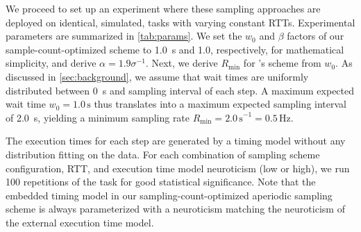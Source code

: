 We proceed to set up an experiment where these sampling approaches are deployed on identical, simulated, tasks with varying constant \acp{RTT}.
Experimental parameters are summarized in \cref{tab:params}.
We set the \( w_0 \) and \( \beta \) factors of our sample-count-optimized scheme to \SI{1.0}{\second} and \num{1.0}, respectively, for mathematical simplicity, and derive \( \alpha = 1.9 \sigma^{-1} \).
Next, we derive \( R_\text{min} \) for \textcite{Wang2019Towards}'s scheme from \( w_0 \).
As discussed in \cref{sec:background}, we assume that wait times are uniformly distributed between \SI{0}{\second} and sampling interval of each step.
A maximum expected wait time \( w_0 = 1.0\,\si{\second} \) thus translates into a maximum expected sampling interval of \SI{2.0}{\second}, yielding a minimum sampling rate \( R_\text{min} = {2.0\,\si{\second}}^{-1} = 0.5\,\si{\hertz} \).


The execution times for each step are generated by a timing model without any distribution fitting on the data.
For each combination of sampling scheme configuration, \ac{RTT}, and execution time model neuroticism (low or high), we run \num{100} repetitions of the task for good statistical significance.
Note that the embedded timing model in our sampling-count-optimized aperiodic sampling scheme is always parameterized with a neuroticism matching the neuroticism of the external execution time model.

